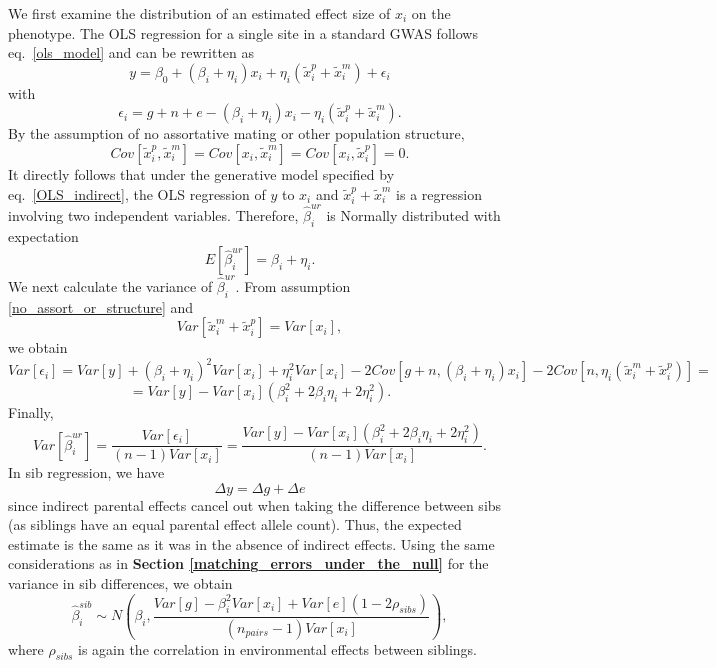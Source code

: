 \documentclass[hidelinks, 12pt]{article}
\begin{document}
We first examine the distribution of an estimated effect size of $x_i$ on the phenotype.  The OLS regression for a single site in a standard GWAS follows eq.~\ref{ols_model} and can be rewritten as
\begin{equation}
\label{OLS_indirect}
y=\beta_0+(\beta_i+\eta_i)x_i+\eta_i(\tilde{x}_i^p+\tilde{x}_i^m)+\epsilon_i
\end{equation}
with
$$\epsilon_i=g+n+e-(\beta_i+\eta_i)x_i-\eta_i(\tilde{x}_i^p+\tilde{x}_i^m).$$
By the assumption of no assortative mating or other population structure,
\begin{equation}
\label{no_assort_or_structure}
Cov[\tilde{x}_i^p,\tilde{x}_i^m]=Cov[x_i,\tilde{x}_i^m]=Cov[x_i,\tilde{x}_i^p]=0.
\end{equation}
It directly follows that under the generative model specified by eq.~\ref{OLS_indirect}, the OLS regression of $y$ to $x_i$ and $\tilde{x}_i^p+\tilde{x}_i^m$ is a regression involving two independent variables.  Therefore, $\hat{\beta}_i^{ur}$ is Normally distributed with expectation 
$$E[\hat{\beta}_i^{ur}]=\beta_i+\eta_i.$$
We next calculate the variance of $\hat{\beta}_i^{ur}$. From assumption \ref{no_assort_or_structure} and 
$$Var[\tilde{x}_i^m+\tilde{x}_i^p]=Var[x_i],$$
we obtain
$$Var[\epsilon_i]=Var[y]+(\beta_i+\eta_i)^2Var[x_i]+\eta_i^2Var[x_i]-2Cov[g+n,(\beta_i+\eta_i)x_i]-2Cov[n,\eta_i(\tilde{x}_i^m+\tilde{x}_i^p)]=$$
$$=Var[y]-Var[x_i] (\beta_i^2+2\beta_i \eta_i + 2 \eta_i^2).$$
Finally,
$$Var[\hat{\beta}_i^{ur}]=\frac{Var[\epsilon_i]}{(n-1)Var[x_i]}=\frac{Var[y]-Var[x_i] (\beta_i^2+2\beta_i \eta_i + 2 \eta_i^2)}{(n-1)Var[x_i]}.$$
In sib regression, we have
$$\Delta y=\Delta g+\Delta e$$
since indirect parental effects cancel out when taking the difference between sibs (as siblings have an equal parental effect allele count). Thus, the expected estimate is the same as it was in the absence of indirect effects.  Using the same considerations as in {\bf Section \ref{matching_errors_under_the_null}} for the variance in sib differences, we obtain    
$$\hat{\beta}_i^{sib} \sim N(\beta_i,\frac{Var[g] - \beta_i^2Var[x_i] + Var[e](1-2\rho_{sibs})}{(n_{pairs}-1) Var[x_i]}),$$
where $\rho_{sibs}$ is again the correlation in environmental effects between siblings.
\end{document}

